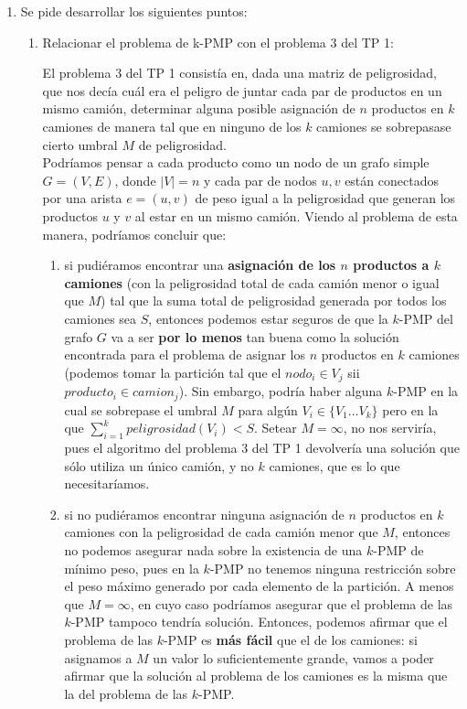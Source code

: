 \documentclass[11pt, a4paper, twoside]{article}
\begin{document}
\begin{enumerate}
    \item Se pide desarrollar los siguientes puntos:
    \begin{enumerate}
		\item Relacionar el problema de k-PMP con el problema 3 del TP 1: 
			  \par El problema 3 del TP 1 consistía en, dada una matriz de peligrosidad, que 
			  nos decía cuál era
			  el peligro de juntar cada par de productos en un mismo camión,  determinar alguna
			  posible asignación de $n$ productos en $k$ camiones de manera tal que en ninguno
			  de los $k$ camiones se sobrepasase cierto umbral $M$ de peligrosidad. \\
			  Podríamos pensar a cada producto como un nodo de un grafo simple $G = (V,E)$, donde 
			  $|V| = n$ y cada par de nodos $u,v$ están conectados por una arista $e = (u,v)$ de
			  peso igual a la peligrosidad que generan los productos $u$ y $v$ al estar en un
			  mismo camión. Viendo al problema de esta manera, podríamos concluir que:
			  \begin{enumerate}
			      \item si pudiéramos encontrar una \textbf{asignación de los $n$ productos a $k$ 
			      camiones} (con la peligrosidad total de cada camión menor o igual que $M$) tal
			      que la suma total de peligrosidad generada por todos los camiones sea $S$, 
			      entonces podemos estar seguros de que la $k$-PMP del grafo $G$ va a ser 
			      \textbf{por lo menos} tan buena como la solución encontrada para el problema
			      de asignar los $n$ productos en $k$ camiones (podemos tomar la partición tal
			      que el $nodo_{i} \in V_{j}$ sii $producto_{i} \in camion_{j}$).
			      Sin embargo, podría haber alguna $k$-PMP en la
			      cual se sobrepase el umbral $M$ para algún $V_{i} \in \{V_{1} \dots V_{k}\}$
			      pero en la que $ \sum\limits_{i=1}^k peligrosidad(V_{i}) < S$. Setear
			      $M = \infty$, no nos serviría, pues el algoritmo del problema 3 del TP 1 
			      devolvería una solución que sólo utiliza un único camión, y no $k$ camiones,
			      que es lo que necesitaríamos.
			      
			      \item si no pudiéramos encontrar ninguna asignación de $n$ productos en $k$ 
			      camiones con la peligrosidad de cada camión menor que $M$, entonces no podemos
			      asegurar nada sobre la existencia de una $k$-PMP de mínimo peso, pues en la
			      $k$-PMP no tenemos ninguna restricción sobre el peso máximo generado por cada
			      elemento de la partición. A menos que $M = \infty$, en cuyo caso podríamos
			      asegurar que el problema de las $k$-PMP tampoco tendría solución. Entonces, podemos
			      afirmar que el problema de las $k$-PMP es \textbf{más fácil} que el de los camiones:
			      si asignamos a $M$ un valor lo suficientemente grande, vamos a poder afirmar que la
			      solución al problema de los camiones es la misma que la del problema de las $k$-PMP.
			      

\end{enumerate}
\end{enumerate}
\end{enumerate}
\end{document}
